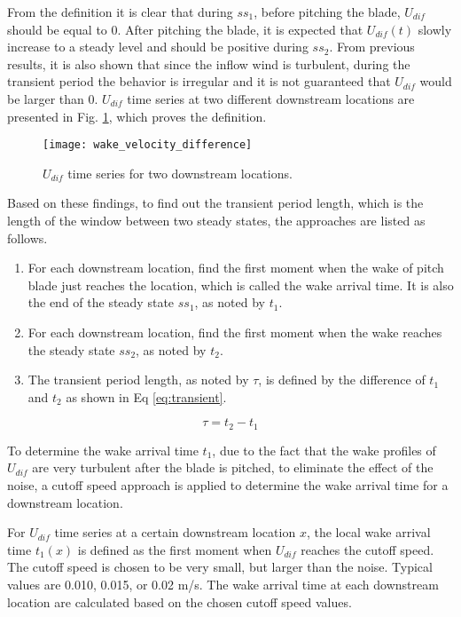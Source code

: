 \documentclass{umthesis}
\begin{document}
From the definition it is clear that during $ss_1$, before pitching the blade, $U_{dif}$ should be equal to 0. After pitching the blade, it is expected that $U_{dif}(t)$ slowly increase to a steady level and  should be positive during $ss_2$. From previous results, it is also shown that since the inflow wind is turbulent, during the transient period the behavior is irregular and it is not guaranteed that $U_{dif}$ would be larger than 0. $U_{dif}$ time series at two different downstream locations are presented in Fig. \ref{fig:wake_velocity_difference}, which proves the definition.

\begin{figure}
  \centering
  \texttt{[image: wake\_velocity\_difference]}
  \caption{$U_{dif}$ time series for two downstream locations.}\label{fig:wake_velocity_difference}
\end{figure}

Based on these findings, to find out the transient period length, which is the length of the window between two steady states, the approaches are listed as follows.

\begin{enumerate}
  \item For each downstream location, find the first moment when the wake of pitch blade just reaches the location, which is called the wake arrival time. It is also the end of the steady state $ss_1$, as noted by $t_1$.
  \item For each downstream location, find the first moment when the wake reaches the steady state $ss_2$, as noted by $t_2$.
  \item The transient period length, as noted by $\tau$, is defined by the difference of $t_1$ and $t_2$ as shown in Eq \ref{eq:transient}.
\end{enumerate}

\begin{equation}\label{eq:transient}
  \tau = t_2 - t_1
\end{equation}

To determine the wake arrival time $t_1$, due to the fact that the wake profiles of $U_{dif}$ are very turbulent after the blade is pitched, to eliminate the effect of the noise, a cutoff speed approach is applied to determine the wake arrival time for a downstream location.

For $U_{dif}$ time series at a certain downstream location $x$, the local wake arrival time $t_1(x)$ is defined as the first moment when $U_{dif}$ reaches the cutoff speed. The cutoff speed is chosen to be very small, but larger than the noise. Typical values are 0.010, 0.015, or 0.02 m/s. The wake arrival time at each downstream location are calculated based on the chosen cutoff speed values.
\end{document}
